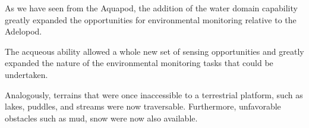 As we have seen from the Aquapod, the addition of the water domain capability greatly expanded the opportunities for environmental monitoring relative to the Adelopod. 

The acqueous ability allowed a whole new set of sensing opportunities and greatly expanded the nature of the environmental monitoring tasks that could be undertaken. 

Analogously, terrains that were once inaccessible to a terrestrial platform, such as lakes, puddles, and streams were now traversable. Furthermore, unfavorable obstacles such as mud, snow were now also available. 

